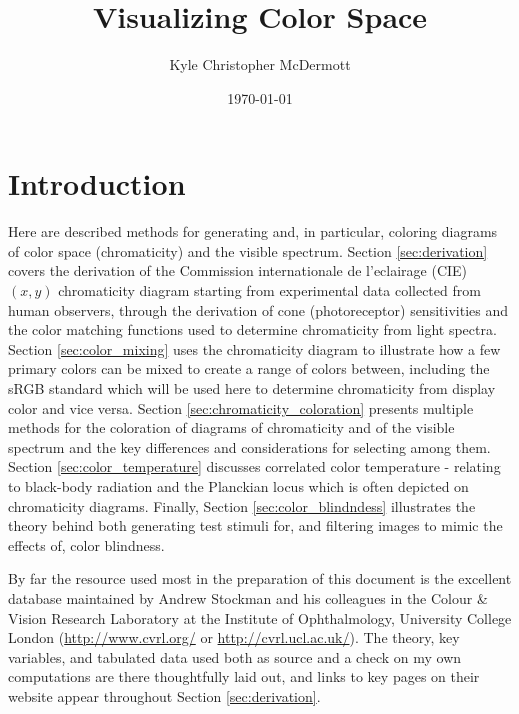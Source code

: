 \documentclass{article}
\title{Visualizing Color Space}
\author{Kyle Christopher McDermott}
\date{\today}
\begin{document}
\begin{titlepage}
\maketitle
\thispagestyle{empty} %
\end{titlepage}



\section{Introduction}

Here are described methods for generating and, in particular, coloring diagrams of color space (chromaticity) and the visible spectrum.  Section \ref{sec:derivation} covers the derivation of the Commission internationale de l'eclairage (CIE) $(x,y)$ chromaticity diagram starting from experimental data collected from human observers, through the derivation of cone (photoreceptor) sensitivities and the color matching functions used to determine chromaticity from light spectra.  Section \ref{sec:color_mixing} uses the chromaticity diagram to illustrate how a few primary colors can be mixed to create a range of colors between, including the sRGB standard which will be used here to determine chromaticity from display color and vice versa.  Section \ref{sec:chromaticity_coloration} presents multiple methods for the coloration of diagrams of chromaticity and of the visible spectrum and the key differences and considerations for selecting among them.  Section \ref{sec:color_temperature} discusses correlated color temperature - relating to black-body radiation and the Planckian locus which is often depicted on chromaticity diagrams.  Finally, Section \ref{sec:color_blindndess} illustrates the theory behind both generating test stimuli for, and filtering images to mimic the effects of, color blindness.

By far the resource used most in the preparation of this document is the excellent database maintained by Andrew Stockman and his colleagues in the Colour \& Vision Research Laboratory at the Institute of Ophthalmology, University College London (\url{http://www.cvrl.org/} or \url{http://cvrl.ucl.ac.uk/}).  The theory, key variables, and tabulated data used both as source and a check on my own computations are there thoughtfully laid out, and links to key pages on their website appear throughout Section \ref{sec:derivation}.
\end{document}
